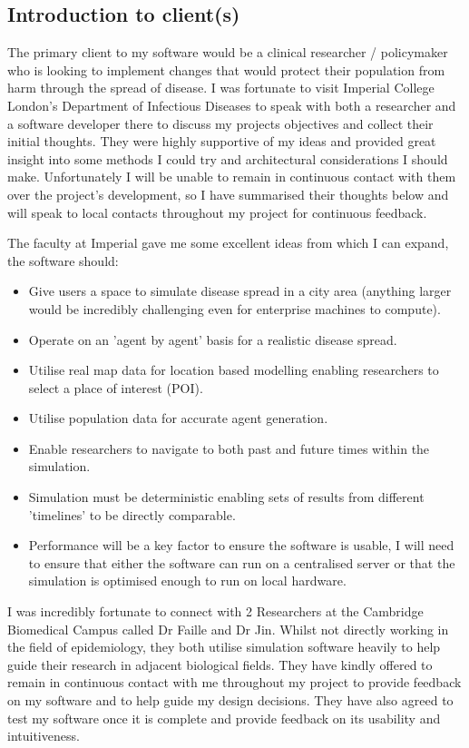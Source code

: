 \subsection{Introduction to client(s)}
The primary client to my software would be a clinical researcher / policymaker who is looking to implement changes that would protect their population from harm through the spread of disease. I was fortunate to visit Imperial College London's Department of Infectious Diseases to speak with both a researcher and a software developer there to discuss my projects objectives and collect their initial thoughts. They were highly supportive of my ideas and provided great insight into some methods I could try and architectural considerations I should make. Unfortunately I will be unable to remain in continuous contact with them over the project's development, so I have summarised their thoughts below and will speak to local contacts throughout my project for continuous feedback.

The faculty at Imperial gave me some excellent ideas from which I can expand, the software should:
\begin{itemize}
    \item Give users a space to simulate disease spread in a city area (anything larger would be incredibly challenging even for enterprise machines to compute).
    \item Operate on an 'agent by agent' basis for a realistic disease spread.
    \item Utilise real map data for location based modelling enabling researchers to select a place of interest (POI).
    \item Utilise population data for accurate agent generation.
    \item Enable researchers to navigate to both past and future times within the simulation.
    \item Simulation must be deterministic enabling sets of results from different 'timelines' to be directly comparable.
    \item Performance will be a key factor to ensure the software is usable, I will need to ensure that either the software can run on a centralised server or that the simulation is optimised enough to run on local hardware.
\end{itemize}

I was incredibly fortunate to connect with 2 Researchers at the Cambridge Biomedical Campus called Dr Faille and Dr Jin. Whilst not directly working in the field of epidemiology, they both utilise simulation software heavily to help guide their research in adjacent biological fields. They have kindly offered to remain in continuous contact with me throughout my project to provide feedback on my software and to help guide my design decisions. They have also agreed to test my software once it is complete and provide feedback on its usability and intuitiveness.

